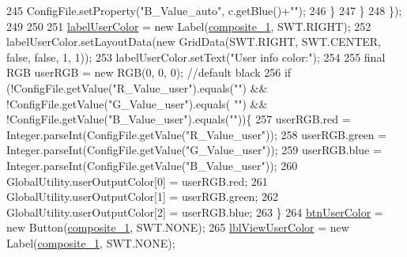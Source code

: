 \begin{DoxyCode}
245                       ConfigFile.setProperty(\textcolor{stringliteral}{"B\_Value\_auto"}, c.getBlue()+\textcolor{stringliteral}{""});
246                   \}
247                 \}
248             \});
249         
250         
251         \hyperlink{classit_1_1isislab_1_1masonhelperdocumentation_1_1mason_1_1wizards_1_1_b___project_information_page_a7b37d666f12fa1c7ea739a7a9878ba9b}{labelUserColor} = \textcolor{keyword}{new} Label(\hyperlink{classit_1_1isislab_1_1masonhelperdocumentation_1_1mason_1_1wizards_1_1_b___project_information_page_ad2438c6d59f23f0717a1503f4e823bb8}{composite\_1}, SWT.RIGHT);
252         labelUserColor.setLayoutData(\textcolor{keyword}{new} GridData(SWT.RIGHT, SWT.CENTER, \textcolor{keyword}{false}, \textcolor{keyword}{false}, 1, 1));
253         labelUserColor.setText(\textcolor{stringliteral}{"User info color:"});
254         
255         \textcolor{keyword}{final} RGB userRGB = \textcolor{keyword}{new} RGB(0, 0, 0);   \textcolor{comment}{//default black}
256         \textcolor{keywordflow}{if} (!ConfigFile.getValue(\textcolor{stringliteral}{"R\_Value\_user"}).equals(\textcolor{stringliteral}{""}) && !ConfigFile.getValue(\textcolor{stringliteral}{"G\_Value\_user"}).equals(\textcolor{stringliteral}{
      ""}) && !ConfigFile.getValue(\textcolor{stringliteral}{"B\_Value\_user"}).equals(\textcolor{stringliteral}{""}))\{
257             userRGB.red = Integer.parseInt(ConfigFile.getValue(\textcolor{stringliteral}{"R\_Value\_user"}));
258             userRGB.green = Integer.parseInt(ConfigFile.getValue(\textcolor{stringliteral}{"G\_Value\_user"}));
259             userRGB.blue = Integer.parseInt(ConfigFile.getValue(\textcolor{stringliteral}{"B\_Value\_user"}));
260             GlobalUtility.userOutputColor[0] = userRGB.red;
261             GlobalUtility.userOutputColor[1] = userRGB.green;
262             GlobalUtility.userOutputColor[2] = userRGB.blue;
263         \}
264         \hyperlink{classit_1_1isislab_1_1masonhelperdocumentation_1_1mason_1_1wizards_1_1_b___project_information_page_a50713187368f9e3d91689c820090feb2}{btnUserColor} = \textcolor{keyword}{new} Button(\hyperlink{classit_1_1isislab_1_1masonhelperdocumentation_1_1mason_1_1wizards_1_1_b___project_information_page_ad2438c6d59f23f0717a1503f4e823bb8}{composite\_1}, SWT.NONE);
265         \hyperlink{classit_1_1isislab_1_1masonhelperdocumentation_1_1mason_1_1wizards_1_1_b___project_information_page_ab1b4ec7a5a8736cf063250290326f061}{lblViewUserColor} = \textcolor{keyword}{new} Label(\hyperlink{classit_1_1isislab_1_1masonhelperdocumentation_1_1mason_1_1wizards_1_1_b___project_information_page_ad2438c6d59f23f0717a1503f4e823bb8}{composite\_1}, SWT.NONE);

\end{DoxyCode}
